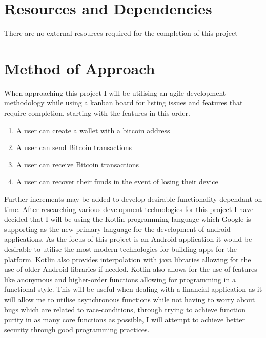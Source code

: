 \documentclass[11pt]{article}
\begin{document}
\section{Resources and Dependencies}
\label{sec:org41498a9}
There are no external resources required for the completion of this project


\section{Method of Approach}
\label{sec:org054c04e}
When approaching this project I will be utilising an agile development methodology while using a kanban board for
listing issues and features that require completion, starting with the features in this order.
\begin{enumerate}
\item A user can create a wallet with a bitcoin address
\label{sec:orge79f723}
\item A user can send Bitcoin transactions
\label{sec:orge2a9c70}
\item A user can receive Bitcoin transactions
\label{sec:orgbd028fc}
\item A user can recover their funds in the event of losing their device
\label{sec:orgd15a632}
\end{enumerate}

Further increments may be added to develop desirable functionality dependant on time.
After researching various development technologies for this project I have decided that I will be using the Kotlin programming language
which Google is supporting as the new primary language for the development of android applications. As the focus of this project is an Android
application it would be desirable to utilise the most modern technologies for building apps for the platform. Kotlin also provides interpolation
with java libraries allowing for the use of older Android libraries if needed. Kotlin also allows for the use of features like anonymous and higher-order functions
allowing for programming in a functional style. This will be useful when dealing with a financial application as it will allow me to utilise
asynchronous functions while not having to worry about bugs which are related to race-conditions, through trying to achieve function purity 
in as many core functions as possible, I will attempt to achieve better security through good programming practices.\\
\end{document}
